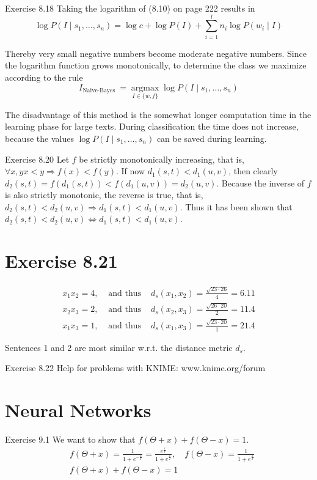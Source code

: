 \documentclass[10pt]{book}
\begin{document}
Exercise 8.18 Taking the logarithm of (8.10) on page 222 results in
$$
\log P\left(I \mid s_{1}, \ldots, s_{n}\right)=\log c+\log P(I)+\sum_{i=1}^{l} n_{i} \log P\left(w_{i} \mid I\right)
$$

Thereby very small negative numbers become moderate negative numbers. Since the logarithm function grows monotonically, to determine the class we maximize according to the rule
$$
I_{\text {Naive-Bayes }}=\underset{I \in\{w, f\}}{\operatorname{argmax}} \log P\left(I \mid s_{1}, \ldots, s_{n}\right)
$$

The disadvantage of this method is the somewhat longer computation time in the learning phase for large texts. During classification the time does not increase, because the values $\log P\left(I \mid s_{1}, \ldots, s_{n}\right)$ can be saved during learning.

Exercise 8.20 Let $f$ be strictly monotonically increasing, that is, $\forall x, y x<y \Rightarrow f(x)<f(y)$. If now $d_{1}(s, t)<d_{1}(u, v)$, then clearly $d_{2}(s, t)=f\left(d_{1}(s, t)\right)<f\left(d_{1}(u, v)\right)=d_{2}(u, v)$. Because the inverse of $f$ is also strictly monotonic, the reverse is true, that is, $d_{2}(s, t)<d_{2}(u, v) \Rightarrow d_{1}(s, t)<d_{1}(u, v)$. Thus it has been shown that $d_{2}(s, t)<d_{2}(u, v) \Leftrightarrow d_{1}(s, t)<d_{1}(u, v)$.

\section{Exercise 8.21}
$$
\begin{array}{lll}
x_{1} x_{2}=4, & \text { and thus } & d_{s}\left(x_{1}, x_{2}\right)=\frac{\sqrt{23 \cdot 26}}{4}=6.11 \\
x_{2} x_{3}=2, & \text { and thus } & d_{s}\left(x_{2}, x_{3}\right)=\frac{\sqrt{26 \cdot 20}}{2}=11.4 \\
x_{1} x_{3}=1, & \text { and thus } & d_{s}\left(x_{1}, x_{3}\right)=\frac{\sqrt{23 \cdot 20}}{1}=21.4
\end{array}
$$

Sentences 1 and 2 are most similar w.r.t. the distance metric $d_{s}$.

Exercise 8.22 Help for problems with KNIME: www.knime.org/forum

\section{Neural Networks}

Exercise 9.1 We want to show that $f(\Theta+x)+f(\Theta-x)=1$.
$$
\begin{aligned}
& f(\Theta+x)=\frac{1}{1+e^{-\frac{x}{T}}}=\frac{e^{\frac{x}{T}}}{1+e^{\frac{x}{T}}}, \quad f(\Theta-x)=\frac{1}{1+e^{\frac{x}{T}}} \\
& f(\Theta+x)+f(\Theta-x)=1
\end{aligned}
$$
\end{document}
